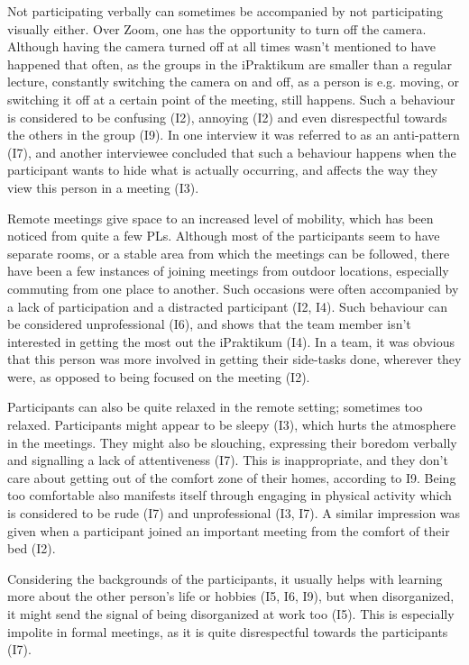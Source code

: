Not participating verbally can sometimes be accompanied by not participating visually either. Over Zoom, one has the opportunity to turn off the camera. Although having the camera turned off at all times wasn't mentioned to have happened that often, as the groups in the iPraktikum are smaller than a regular lecture, constantly switching the camera on and off, as a person is e.g. moving, or switching it off at a certain point of the meeting, still happens. Such a behaviour is considered to be confusing (I2), annoying (I2) and even disrespectful towards the others in the group (I9). In one interview it was referred to as an anti-pattern (I7), and another interviewee concluded that such a behaviour happens when the participant wants to hide what is actually occurring, and affects the way they view this person in a meeting (I3). 

Remote meetings give space to an increased level of mobility, which has been noticed from quite a few PLs. Although most of the participants seem to have separate rooms, or a stable area from which the meetings can be followed, there have been a few instances of joining meetings from outdoor locations, especially commuting from one place to another. Such occasions were often accompanied by a lack of participation and a distracted participant (I2, I4). Such behaviour can be considered unprofessional (I6), and shows that the team member isn't interested in getting the most out the iPraktikum (I4). In a team, it was obvious that this person was more involved in getting their side-tasks done, wherever they were, as opposed to being focused on the meeting (I2).

Participants can also be quite relaxed in the remote setting; sometimes too relaxed. Participants might appear to be sleepy (I3), which hurts the atmosphere in the meetings. They might also be slouching, expressing their boredom verbally and signalling a lack of attentiveness (I7). This is inappropriate, and they don't care about getting out of the comfort zone of their homes, according to I9. Being too comfortable also manifests itself through engaging in physical activity which is considered to be rude (I7) and unprofessional (I3, I7). A similar impression was given when a participant joined an important meeting from the comfort of their bed (I2).

Considering the backgrounds of the participants, it usually helps with learning more about the other person's life or hobbies (I5, I6, I9), but when disorganized, it might send the signal of being disorganized at work too (I5). This is especially impolite in formal meetings, as it is quite disrespectful towards the participants (I7).

